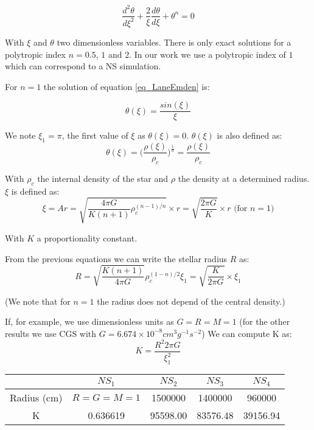 \begin{equation}\label{eq_LaneEmden}
  \frac{d^2\theta}{d \xi^2}+ \frac{2}{\xi}\frac{d\theta}{d\xi}+\theta^n = 0
\end{equation}

With $\xi$ and $\theta$ two dimensionless variables. 
There is only exact solutions for a polytropic index $n = 0.5$, $1$ and $2$.
In our work we use a polytropic index of $1$ which can correspond to a NS simulation.

For $n=1$ the solution of equation \ref{eq_LaneEmden} is: 

\begin{equation}
\theta(\xi)=\frac{sin(\xi)}{\xi}
\end{equation}

We note $\xi_1 = \pi$, the first value of $\xi$ as $\theta(\xi) = 0$.
$\theta(\xi)$ is also defined as: 
\begin{equation}
 \theta(\xi) = \Big(\frac{\rho(\xi)}{\rho_c}\Big)^{\frac{1}{n}}  = \frac{\rho(\xi)}{\rho_c}
\end{equation}

With $\rho_c$ the internal density of the star and $\rho$ the density at a determined radius. $\xi$ is defined as:  
$$ \xi = Ar = \sqrt{\frac{4\pi G}{K(n+1)}\rho_c^{(n-1)/n}} \times r = \sqrt{\frac{2\pi G}{K}}\times r \mbox{ (for } n=1 \mbox{)}$$

With $K$ a proportionality constant.

From the previous equations we can write the stellar radius $R$ as:
\begin{equation}
R = \sqrt{\frac{K(n+1)}{4\pi G}}\rho_c^{(1-n)/2}\xi_1 = \sqrt{ \frac{K}{2\pi G} } \times \xi_1
\end{equation} 

(We note that for $n=1$ the radius does not depend of the central density.)

If, for example, we use dimensionless units as $G=R=M=1$ (for the other results we use CGS with $G = 6.674 \times 10^{-8} cm^3g^{-1}s^{-2}$) 
We can compute K as: 
\begin{equation}
\label{eq:constant}
K = \frac{R^2  2 \pi G}{\xi_1^2}
\end{equation}

\begin{center}

\begin{tabular}{c|c|c|c|c|}
 & $NS_1$ & $NS_2$ & $NS_3$ & $NS_4$ \\ 
\hline 
Radius (cm) & $R=G=M=1$ & 1500000 & 1400000 & 960000 \\ 
\hline 
K & 0.636619 & 95598.00 & 83576.48 & 39156.94\\ 
\hline 
\end{tabular}

\end{center} 

